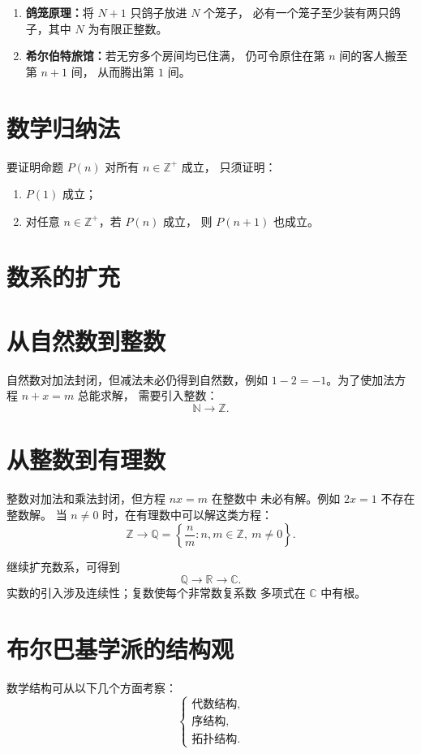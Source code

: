 \documentclass[UTF8,11pt]{ctexart}
\theoremstyle{cnthm}
\begin{document}
\begin{enumerate}
\item \textbf{鸽笼原理：}将 \(N+1\) 只鸽子放进 \(N\) 个笼子，
必有一个笼子至少装有两只鸽子，其中 \(N\) 为有限正整数。
\item \textbf{希尔伯特旅馆：}若无穷多个房间均已住满，
仍可令原住在第 \(n\) 间的客人搬至第 \(n+1\) 间，
从而腾出第 \(1\) 间。
\end{enumerate}

\section{数学归纳法}

要证明命题 \(P(n)\) 对所有 \(n\in\mathbb Z^+\) 成立，
只须证明：
\begin{enumerate}
\item \(P(1)\) 成立；
\item 对任意 \(n\in\mathbb Z^+\)，若 \(P(n)\) 成立，
则 \(P(n+1)\) 也成立。
\end{enumerate}

\section{数系的扩充}

\section{从自然数到整数}

自然数对加法封闭，但减法未必仍得到自然数，例如
\(1-2=-1\)。为了使加法方程 \(n+x=m\) 总能求解，
需要引入整数：
\[
\mathbb N\longrightarrow\mathbb Z.
\]

\section{从整数到有理数}

整数对加法和乘法封闭，但方程 \(nx=m\) 在整数中
未必有解。例如 \(2x=1\) 不存在整数解。
当 \(n\ne0\) 时，在有理数中可以解这类方程：
\[
\mathbb Z\longrightarrow
\mathbb Q
=
\left\{\frac nm:n,m\in\mathbb Z,\ m\ne0\right\}.
\]

继续扩充数系，可得到
\[
\mathbb Q\longrightarrow\mathbb R\longrightarrow\mathbb C.
\]
实数的引入涉及连续性；复数使每个非常数复系数
多项式在 \(\mathbb C\) 中有根。

\section{布尔巴基学派的结构观}

数学结构可从以下几个方面考察：
\[
\left\{
\begin{array}{l}
\text{代数结构},\\
\text{序结构},\\
\text{拓扑结构}.
\end{array}
\right.
\]
\end{document}
